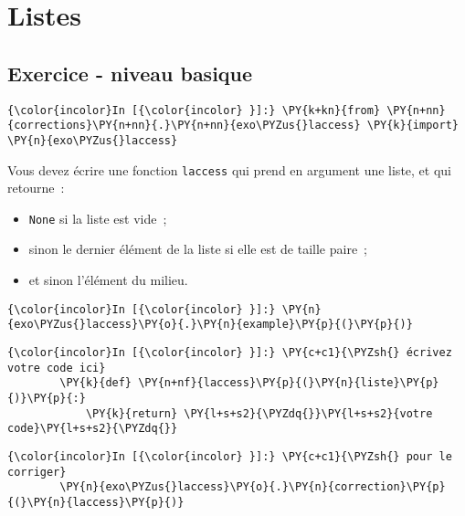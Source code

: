     \hypertarget{listes}{%
\section{Listes}\label{listes}}

    \hypertarget{exercice---niveau-basique}{%
\subsection{Exercice - niveau basique}\label{exercice---niveau-basique}}

    \begin{Verbatim}[commandchars=\\\{\}]
{\color{incolor}In [{\color{incolor} }]:} \PY{k+kn}{from} \PY{n+nn}{corrections}\PY{n+nn}{.}\PY{n+nn}{exo\PYZus{}laccess} \PY{k}{import} \PY{n}{exo\PYZus{}laccess}
\end{Verbatim}


    Vous devez écrire une fonction \texttt{laccess} qui prend en argument
une liste, et qui retourne~:

\begin{itemize}
\tightlist
\item
  \texttt{None} si la liste est vide~;
\item
  sinon le dernier élément de la liste si elle est de taille paire~;
\item
  et sinon l'élément du milieu.
\end{itemize}

    \begin{Verbatim}[commandchars=\\\{\}]
{\color{incolor}In [{\color{incolor} }]:} \PY{n}{exo\PYZus{}laccess}\PY{o}{.}\PY{n}{example}\PY{p}{(}\PY{p}{)}
\end{Verbatim}


    \begin{Verbatim}[commandchars=\\\{\}]
{\color{incolor}In [{\color{incolor} }]:} \PY{c+c1}{\PYZsh{} écrivez votre code ici}
        \PY{k}{def} \PY{n+nf}{laccess}\PY{p}{(}\PY{n}{liste}\PY{p}{)}\PY{p}{:}
            \PY{k}{return} \PY{l+s+s2}{\PYZdq{}}\PY{l+s+s2}{votre code}\PY{l+s+s2}{\PYZdq{}}
\end{Verbatim}


    \begin{Verbatim}[commandchars=\\\{\}]
{\color{incolor}In [{\color{incolor} }]:} \PY{c+c1}{\PYZsh{} pour le corriger}
        \PY{n}{exo\PYZus{}laccess}\PY{o}{.}\PY{n}{correction}\PY{p}{(}\PY{n}{laccess}\PY{p}{)}
\end{Verbatim}


